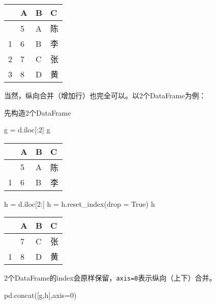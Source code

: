 \documentclass[
  letterpaper,
  DIV=11,
  numbers=noendperiod]{scrreprt}
\newenvironment{Shaded}{\begin{snugshade}}{\end{snugshade}}
\newcommand{\DecValTok}[1]{\textcolor[rgb]{0.68,0.00,0.00}{#1}}
\newcommand{\NormalTok}[1]{\textcolor[rgb]{0.00,0.23,0.31}{#1}}
\newcommand{\OperatorTok}[1]{\textcolor[rgb]{0.37,0.37,0.37}{#1}}
\newcommand{\VariableTok}[1]{\textcolor[rgb]{0.07,0.07,0.07}{#1}}
\begin{document}
\begin{longtable}[]{@{}llll@{}}
\toprule\noalign{}
& A & B & C \\
\midrule\noalign{}
\endhead
\bottomrule\noalign{}
\endlastfoot
0 & 5 & A & 陈 \\
1 & 6 & B & 李 \\
2 & 7 & C & 张 \\
3 & 8 & D & 黄 \\
\end{longtable}

当然，纵向合并（增加行）也完全可以。以2个DataFrame为例：

先构造2个DataFrame

\begin{Shaded}
\begin{Highlighting}[]
\NormalTok{g }\OperatorTok{=}\NormalTok{ d.iloc[:}\DecValTok{2}\NormalTok{]}
\NormalTok{g}
\end{Highlighting}
\end{Shaded}

\begin{longtable}[]{@{}llll@{}}
\toprule\noalign{}
& A & B & C \\
\midrule\noalign{}
\endhead
\bottomrule\noalign{}
\endlastfoot
0 & 5 & A & 陈 \\
1 & 6 & B & 李 \\
\end{longtable}

\begin{Shaded}
\begin{Highlighting}[]
\NormalTok{h }\OperatorTok{=}\NormalTok{ d.iloc[}\DecValTok{2}\NormalTok{:]}
\NormalTok{h }\OperatorTok{=}\NormalTok{ h.reset\_index(drop }\OperatorTok{=} \VariableTok{True}\NormalTok{)}
\NormalTok{h}
\end{Highlighting}
\end{Shaded}

\begin{longtable}[]{@{}llll@{}}
\toprule\noalign{}
& A & B & C \\
\midrule\noalign{}
\endhead
\bottomrule\noalign{}
\endlastfoot
0 & 7 & C & 张 \\
1 & 8 & D & 黄 \\
\end{longtable}

2个DataFrame的index会原样保留，\texttt{axis=0}表示纵向（上下）合并。

\begin{Shaded}
\begin{Highlighting}[]
\NormalTok{pd.concat([g,h],axis}\OperatorTok{=}\DecValTok{0}\NormalTok{)}
\end{Highlighting}
\end{Shaded}
\end{document}
